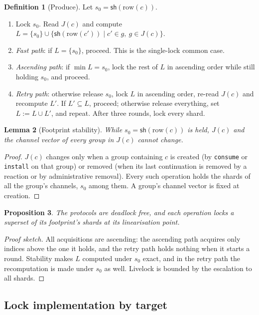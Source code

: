 \documentclass[11pt]{article}
\theoremstyle{plain}
\newtheorem{proposition}{Proposition}[section]
\newtheorem{lemma}[proposition]{Lemma}
\theoremstyle{definition}
\newtheorem{definition}[proposition]{Definition}
\newcommand{\sh}{\mathsf{sh}}
\newcommand{\code}[1]{\texttt{#1}}
\begin{document}
\begin{definition}[Produce]\label{proto:produce}
Let $s_0=\sh(\mathrm{row}(c))$.
\begin{enumerate}[nosep]
\item Lock $s_0$. Read $J(c)$ and compute $L=\{s_0\}\cup\{\sh(\mathrm{row}(c'))\mid
      c'\in g,\ g\in J(c)\}$.
\item \emph{Fast path}: if $L=\{s_0\}$, proceed. This is the single-lock common case.
\item \emph{Ascending path}: if $\min L=s_0$, lock the rest of $L$ in ascending
      order while still holding $s_0$, and proceed.
\item \emph{Retry path}: otherwise release $s_0$, lock $L$ in ascending order,
      re-read $J(c)$ and recompute $L'$. If $L'\subseteq L$, proceed; otherwise
      release everything, set $L:=L\cup L'$, and repeat. After three rounds, lock
      every shard.
\end{enumerate}
\end{definition}

\begin{lemma}[Footprint stability]
While $s_0=\sh(\mathrm{row}(c))$ is held, $J(c)$ and the channel vector of every
group in $J(c)$ cannot change.
\end{lemma}
\begin{proof}
$J(c)$ changes only when a group containing $c$ is created (by \code{consume} or
\code{install} on that group) or removed (when its last continuation is removed by a
reaction or by administrative removal). Every such operation holds the shards of all
the group's channels, $s_0$ among them. A group's channel vector is fixed at creation.
\end{proof}

\begin{proposition}
The protocols are deadlock free, and each operation locks a superset of its footprint's
shards at its linearisation point.
\end{proposition}
\begin{proof}[Proof sketch]
All acquisitions are ascending: the ascending path acquires only indices above the
one it holds, and the retry path holds nothing when it starts a round. Stability
makes $L$ computed under $s_0$ exact, and in the retry path the recomputation is
made under $s_0$ as well. Livelock is bounded by the escalation to all shards.
\end{proof}

\subsection{Lock implementation by target}
\end{document}
